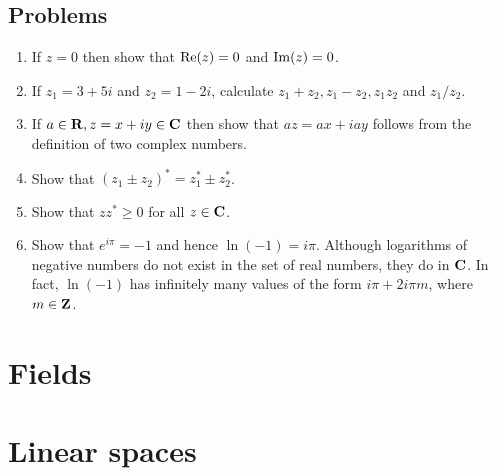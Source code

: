 \subsection{Problems}
\begin{enumerate}
\item If $z = 0$ then show that $\operatorname{Re}(z) = 0$ and $\operatorname{Im}(z) = 0$.
\item If $z_1 = 3 + 5i$ and $z_2 = 1 - 2i$, calculate $z_1 + z_2, z_1 - z_2, z_1z_2$
and $z_1/z_2$.
\item If $a \in \mathbf{R}, z = x + iy \in \mathbf{C}$ then show that $az = ax + iay$ follows from
the definition of two complex numbers.
\item Show that $(z_1 \pm z_2)^\ast = z_1^\ast \pm z_2^\ast$.
\item Show that $zz^\ast \ge 0$ for all $z \in \mathbf{C}$. 
\item Show that $e^{i\pi} = -1$ and hence $\ln(-1) = i\pi$. Although logarithms 
of negative numbers do not exist in the set of real numbers, they do in $\mathbf{C}$. In
fact, $\ln(-1)$ has infinitely many values of the form $i\pi + 2i\pi m$, where 
$m \in \mathbf{Z}$.
\end{enumerate}
\section{Fields}\label{c1s4}
\section{Linear spaces}\label{c1s5}